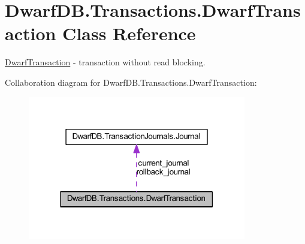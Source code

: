\hypertarget{class_dwarf_d_b_1_1_transactions_1_1_dwarf_transaction}{
\section{DwarfDB.Transactions.DwarfTransaction Class Reference}
\label{class_dwarf_d_b_1_1_transactions_1_1_dwarf_transaction}
}


\hyperlink{class_dwarf_d_b_1_1_transactions_1_1_dwarf_transaction}{DwarfTransaction} -\/ transaction without read blocking.  




Collaboration diagram for DwarfDB.Transactions.DwarfTransaction:
\nopagebreak
\begin{figure}[H]
\begin{center}
\leavevmode
\includegraphics[width=270pt]{class_dwarf_d_b_1_1_transactions_1_1_dwarf_transaction__coll__graph}
\end{center}
\end{figure}
